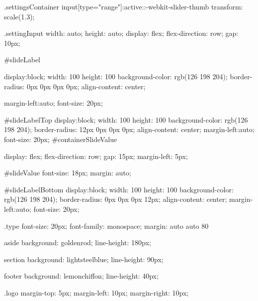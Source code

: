 \documentclass[12pt]{article} %
\begin{document}
\begin{htmlcode}[caption={CSS Stlye Sheet}]
{ }

 .settingsContainer input[type="range"]:active::-webkit-slider-thumb {
   transform: scale(1.3);
}

.settingInput
{
   width: auto;
   height: auto;
   display: flex;
   flex-direction: row;
   gap: 10px;
}

#slideLabel
{
   display:block;
   width: 100%
   height: 100%
   background-color: rgb(126 198 204);
   border-radius: 0px 0px 0px 0px;
   align-content: center;
  
   margin-left:auto;
   font-size: 20px;
}

#slideLabelTop
{
   display:block;
   width: 100%
   height: 100%
   background-color: rgb(126 198 204);
   border-radius: 12px 0px 0px 0px;
   align-content: center;
   margin-left:auto;
   font-size: 20px;
}
#containerSlideValue
{
  
   display: flex;
   flex-direction: row;
   gap: 15px;
   margin-left: 5px;
}

#slideValue
{
   font-size: 18px;
   margin: auto;
}



#slideLabelBottom
{
   display:block;
   width: 100%
   height: 100%
   background-color: rgb(126 198 204);
   border-radius: 0px 0px 0px 12px;
   align-content: center;
   margin-left:auto;
   font-size: 20px;
}

.type
{
   font-size: 20px;
   font-family: monospace;
   margin: auto auto 80%
}

aside 
{
   background: goldenrod;
   line-height: 180px;
}
    
section 
{
   background: lightsteelblue;
   line-height: 90px;
}
    
footer 
{
   background: lemonchiffon;
   line-height: 40px;
}
    
.logo
{
   margin-top: 5px;
   margin-left: 10px;
   margin-right: 10px;
}
    
\end{htmlcode}

\pagebreak
\end{document}
